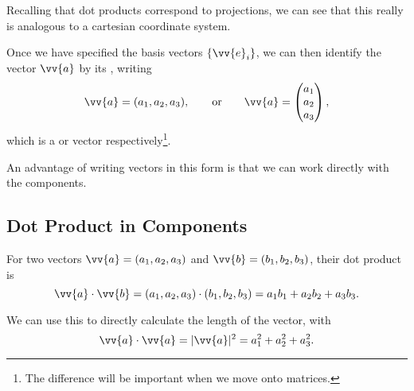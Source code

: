 Recalling that dot products correspond to projections, we can see that this really is analogous to a cartesian coordinate system.

\begin{center}
\end{center}
Once we have specified the basis vectors $\{\vv{e}_i\}$, we can then identify the vector $\vv{a}$ by its , writing 
$$
\vv{a} = (a_1, a_2, a_3), \quad \quad \text{or} \quad \quad \vv{a} = \begin{pmatrix} a_1 \\ a_2 \\ a_3 \end{pmatrix},
$$
which is a  or  vector respectively\footnote{The difference will be important when we move onto matrices.}.

An advantage of writing vectors in this form is that we can work directly with the components.

\subsection{Dot Product in Components}

For two vectors $\vv{a} = (a_1, a_2, a_3)$ and $\vv{b} = (b_1, b_2, b_3)$, their dot product is
$$
\vv{a} \cdot \vv{b} = (a_1, a_2, a_3) \cdot (b_1, b_2, b_3) = a_1 b_1 + a_2 b_2 + a_3 b_3.
$$

We can use this to directly calculate the length of the vector,
with
$$
\vv{a}\cdot\vv{a} = |\vv{a}|^2 = a_1 ^2 + a_2 ^2 + a_3^2.
$$


